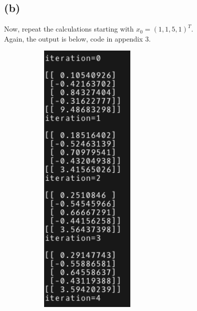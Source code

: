 \documentclass{article}
\begin{document}
\subsection*{(b)}
Now, repeat the calculations starting with $x_0=(1,1,5,1)^T$.\\
Again, the output is below, code in appendix 3.
\begin{figure}[H]
    \centering
    \begin{subfigure}[b]{0.5\textwidth}
        \includegraphics[width=0.5\textwidth]{p3b1.png}
    \end{subfigure}
    \begin{subfigure}[b]{0.49\textwidth}

\end{subfigure}
\end{figure}
\end{document}
